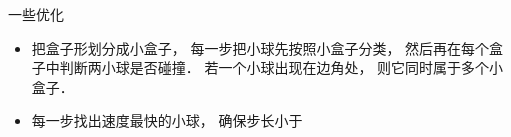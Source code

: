 
一些优化
\begin{itemize}
\item 把盒子形划分成小盒子， 每一步把小球先按照小盒子分类， 然后再在每个盒子中判断两小球是否碰撞． 若一个小球出现在边角处， 则它同时属于多个小盒子．
\item 每一步找出速度最快的小球， 确保步长小于
\end{itemize}
